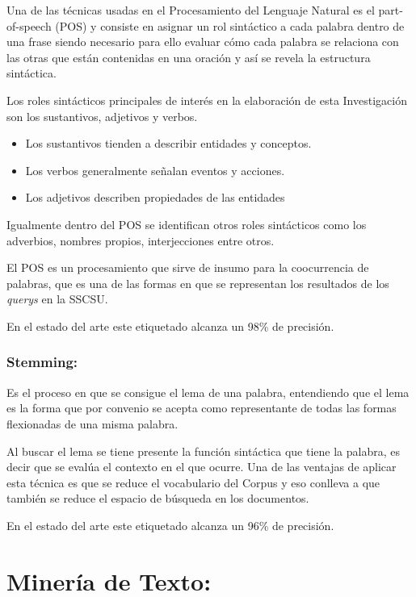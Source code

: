 \documentclass[
  10,
  spanish,
  openany]{book}
\begin{document}
Una de las técnicas usadas en el Procesamiento del Lenguaje Natural es el part-of-speech (POS) y consiste en asignar un rol sintáctico a cada palabra dentro de una frase \citep{eisenstein2019} siendo necesario para ello evaluar cómo cada palabra se relaciona con las otras que están contenidas en una oración y así se revela la estructura sintáctica.

Los roles sintácticos principales de interés en la elaboración de esta Investigación son los sustantivos, adjetivos y verbos.

\begin{itemize}
\item
  Los sustantivos tienden a describir entidades y conceptos.
\item
  Los verbos generalmente señalan eventos y acciones.
\item
  Los adjetivos describen propiedades de las entidades
\end{itemize}

Igualmente dentro del POS se identifican otros roles sintácticos como los adverbios, nombres propios, interjecciones entre otros.

El POS es un procesamiento que sirve de insumo para la coocurrencia de palabras, que es una de las formas en que se representan los resultados de los \emph{querys} en la SSCSU.

En el estado del arte este etiquetado alcanza un 98\% de precisión.

\hypertarget{steaming}{%
\subsubsection{Stemming:}\label{steaming}}

Es el proceso en que se consigue el lema de una palabra, entendiendo que el lema es la forma que por convenio se acepta como representante de todas las formas flexionadas de una misma palabra.

Al buscar el lema se tiene presente la función sintáctica que tiene la palabra, es decir que se evalúa el contexto en el que ocurre. Una de las ventajas de aplicar esta técnica es que se reduce el vocabulario del Corpus y eso conlleva a que también se reduce el espacio de búsqueda en los documentos.

En el estado del arte este etiquetado alcanza un 96\% de precisión.

\hypertarget{textmin}{%
\section{Minería de Texto:}\label{textmin}}
\end{document}
